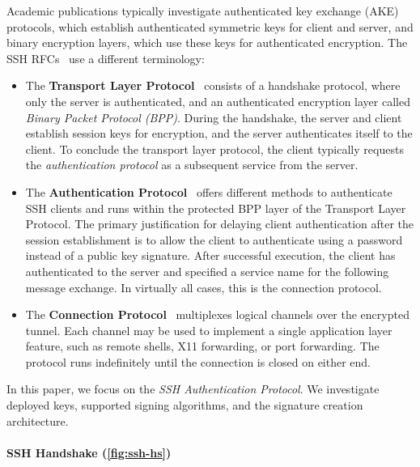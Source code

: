 Academic publications typically investigate authenticated key exchange (AKE) protocols, which establish authenticated symmetric keys for client and server, and binary encryption layers, which use these keys for authenticated encryption. The SSH RFCs~\cite{rfc4252,rfc4253,rfc4254} use a different terminology:
\begin{itemize}
    \item The \textbf{Transport Layer Protocol}~\cite{rfc4253} consists of a handshake protocol, where only the server is authenticated, and an authenticated encryption layer called \emph{Binary Packet Protocol (BPP)}.
    During the handshake, the server and client establish session keys for encryption, and the server authenticates itself to the client. To conclude the transport layer protocol, the client typically requests the \emph{authentication protocol} as a subsequent service from the server.
    \item The \textbf{Authentication Protocol}~\cite{rfc4252} offers different methods to authenticate SSH clients and runs within the protected BPP layer of the Transport Layer Protocol. The primary justification for delaying client authentication after the session establishment is to allow the client to authenticate using a password instead of a public key signature. After successful execution, the client has authenticated to the server and specified a service name for the following message exchange. In virtually all cases, this is the connection protocol.
    \item The \textbf{Connection Protocol}~\cite{rfc4254} multiplexes logical channels over the encrypted tunnel. Each channel may be used to implement a single application layer feature, such as remote shells, X11 forwarding, or port forwarding. The protocol runs indefinitely until the connection is closed on either end.
\end{itemize}
In this paper, we focus on the \emph{SSH Authentication Protocol}.
We investigate deployed keys, supported signing algorithms, and the signature creation architecture.


\paragraph{SSH Handshake (\autoref{fig:ssh-hs})}

